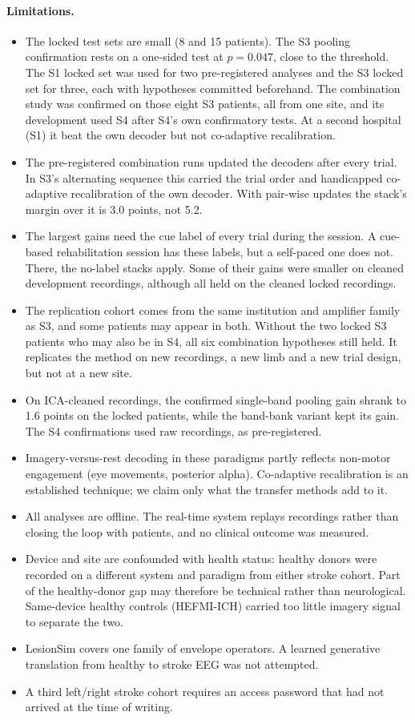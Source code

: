 \paragraph{Limitations.}
\begin{itemize}
  \item The locked test sets are small (8 and 15 patients). The S3 pooling confirmation rests on a one-sided test at $p = 0.047$, close to the threshold. The S1 locked set was used for two pre-registered analyses and the S3 locked set for three, each with hypotheses committed beforehand. The combination study was confirmed on those eight S3 patients, all from one site, and its development used S4 after S4's own confirmatory tests. At a second hospital (S1) it beat the own decoder but not co-adaptive recalibration.
  \item The pre-registered combination runs updated the decoders after every trial. In S3's alternating sequence this carried the trial order and handicapped co-adaptive recalibration of the own decoder. With pair-wise updates the stack's margin over it is 3.0 points, not 5.2.
  \item The largest gains need the cue label of every trial during the session. A cue-based rehabilitation session has these labels, but a self-paced one does not. There, the no-label stacks apply. Some of their gains were smaller on cleaned development recordings, although all held on the cleaned locked recordings.
  \item The replication cohort comes from the same institution and amplifier family as S3, and some patients may appear in both. Without the two locked S3 patients who may also be in S4, all six combination hypotheses still held. It replicates the method on new recordings, a new limb and a new trial design, but not at a new site.
  \item On ICA-cleaned recordings, the confirmed single-band pooling gain shrank to 1.6 points on the locked patients, while the band-bank variant kept its gain. The S4 confirmations used raw recordings, as pre-registered.
  \item Imagery-versus-rest decoding in these paradigms partly reflects non-motor engagement (eye movements, posterior alpha). Co-adaptive recalibration is an established technique; we claim only what the transfer methods add to it.
  \item All analyses are offline. The real-time system replays recordings rather than closing the loop with patients, and no clinical outcome was measured.
  \item Device and site are confounded with health status: healthy donors were recorded on a different system and paradigm from either stroke cohort. Part of the healthy-donor gap may therefore be technical rather than neurological. Same-device healthy controls (HEFMI-ICH) carried too little imagery signal to separate the two.
  \item LesionSim covers one family of envelope operators. A learned generative translation from healthy to stroke EEG was not attempted.
  \item A third left/right stroke cohort \citep{mathi2025} requires an access password that had not arrived at the time of writing.
\end{itemize}

